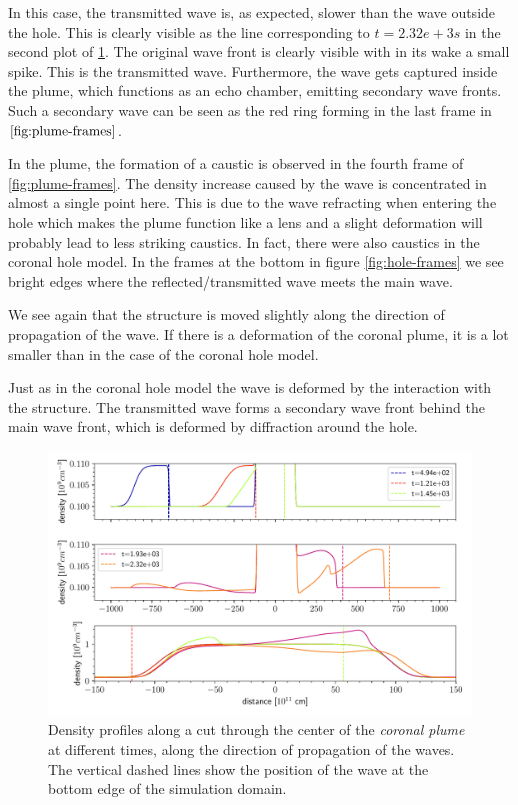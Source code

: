 In this case, the transmitted wave is, as expected, slower than the wave outside the hole.
This is clearly visible as the line corresponding to $t=2.32e+3 s$ in the second plot of \cref{fig:plume-sections}.
The original wave front is clearly visible with in its wake a small spike. This is the transmitted wave.
Furthermore, the wave gets captured inside the plume, which functions as an echo chamber, emitting secondary wave fronts.
Such a secondary wave can be seen as the red ring forming in the last frame in $\cref{fig:plume-frames}$.

In the plume, the formation of a caustic is observed in the fourth frame of \cref{fig:plume-frames}. 
The density increase caused by the wave is concentrated in almost a single point here. 
This is due to the wave refracting when entering the hole which makes the plume function like a lens and a slight deformation will probably lead to less striking caustics.
In fact, there were also caustics in the coronal hole model.
In the frames at the bottom in figure \cref{fig:hole-frames} we see bright edges where the reflected/transmitted wave meets the main wave.

We see again that the structure is moved slightly along the direction of propagation of the wave. 
If there is a deformation of the coronal plume, it is a lot smaller than in the case of the coronal hole model.

Just as in the coronal hole model the wave is deformed by the interaction with the structure.
The transmitted wave forms a secondary wave front behind the main wave front, which is deformed by diffraction around the hole.

\begin{figure}[H]
	\centering
	\includegraphics[width=\linewidth]{images/plume-sections.pdf}
	\caption{Density profiles along a cut through the center of the \emph{coronal plume} at different times, along the direction of propagation of the waves.
	The vertical dashed lines show the position of the wave at the bottom edge of the simulation domain.}
	\label{fig:plume-sections}
\end{figure}

